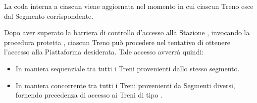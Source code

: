 \begin{description}
		La coda interna a ciascun  viene aggiornata nel momento in cui ciascun Treno esce dal Segmento corrispondente. 
		
		
		\item{}
		
		Dopo aver superato la barriera di controllo d'accesso alla Stazione , invocando la procedura protetta , ciascun Treno può procedere nel tentativo di ottenere l'accesso alla Piattaforma desiderata. Tale accesso avverrà quindi:
		
		\begin{itemize}
			\item In maniera sequenziale tra tutti i Treni provenienti dallo stesso segmento.
			\item In maniera concorrente tra tutti i Treni provenienti da Segmenti diversi, fornendo precedenza di accesso ai Treni di tipo .
		\end{itemize}
		

\end{description}
